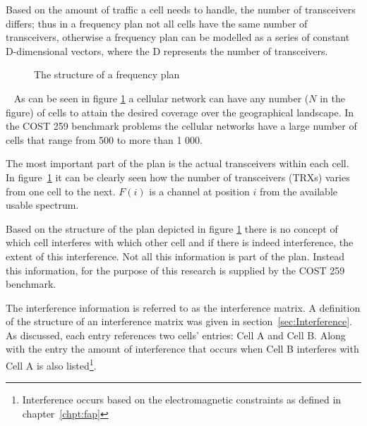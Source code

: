 Based on the amount of traffic a cell needs to handle, the number of transceivers differs; thus in a frequency plan not all cells have the same number of transceivers, otherwise a frequency plan can be modelled as a series of constant D-dimensional vectors, where the D represents the number of transceivers. 
~
\begin{figure}[ht]
	\centering
	\setlength \fboxsep{0pt}
	\setlength \fboxrule{0.5pt}
	\caption{The structure of a frequency plan}
	\label{fig:fapPlan}
\end{figure}
~
As can be seen in figure \ref{fig:fapPlan} a cellular network can have any number ($N$ in the figure) of cells to attain the desired coverage over the geographical landscape. In the COST 259 benchmark problems the cellular networks have a large number of cells that range from 500 to more than 1 000. 

The most important part of the plan is the actual transceivers within each cell. In figure~\ref{fig:fapPlan} it can be clearly seen how the number of transceivers (TRXs) varies from one cell to the next. $F(i)$ is a channel at position $i$ from the available usable spectrum. 

Based on the structure of the plan depicted in figure \ref{fig:fapPlan} there is no concept of which cell interferes with which other cell and if there is indeed interference, the extent of this interference. Not all this information is part of the plan. Instead this information, for the purpose of this research is supplied by the COST 259 benchmark. 

The interference information is referred to as the interference matrix. A definition of the structure of an interference matrix was given in section~\ref{sec:Interference}. As discussed, each entry references two cells' entries: Cell A and Cell B. Along with the entry the amount of interference that occurs when Cell B interferes with Cell A is also listed\footnote{Interference occurs based on the electromagnetic constraints as defined in chapter~\ref{chpt:fap}}.

